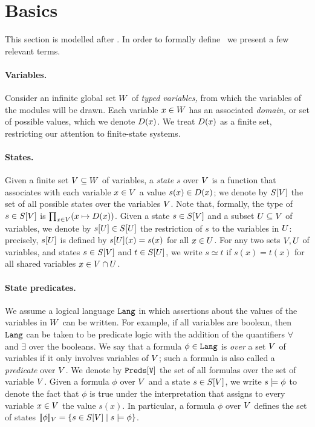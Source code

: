 \section{Basics}
This section is modelled after \cite{daLect}. In order to formally
define \im \ we present a few relevant terms.


\paragraph{Variables.}
Consider an infinite global set ${ W}$ of {\em typed
variables,} from which the variables of the modules will be drawn.
Each variable $x \in {W}$ has an associated {\em domain,} or
set of possible values, which we denote ${ D}(x)$. We treat
${ D}(x)$ as a finite set, restricting our attention to
finite-state systems.

\paragraph{States.}
Given a finite set ${ V}\subseteq{W}$ of variables, a {\em
state\/} $s$ over ${ V}$ is a function that associates with each
variable $x \in {V}$ a value $s(x) \in {D}(x)$; we denote by
${ S}[{ V}]$ the set of all possible states over the variables
${ V}$. Note that, formally, the type of $s \in {S}[{ V}]$
is $\prod_{x\in{V}} (x \mapsto {D}(x))$. Given a state $s
\in {S}[{ V}]$ and a subset ${ U} \subseteq {V}$ of
variables, we denote by $s[{ U}] \in {S}[{ U}]$ the
restriction of $s$ to the variables in ${ U}$: precisely,
$s[{ U}]$ is defined by $s[{ U}](x) = s(x)$ for all $x \in
{U}$. For any two sets ${ V},{ U}$ of variables, and states
$s \in {S}[{ V}]$ and $t \in {S}[{ U}]$, we write $s
\simeq t$ if $s(x) = t(x)$ for all shared variables $x \in {V}
\cap {U}$.

\paragraph{State predicates.}
We assume a logical language ${\tt{Lang}}$ in which assertions about
the values of the variables in ${ W}$ can be written. For
example, if all variables are boolean, then ${\tt{Lang}}$ can be
taken to be predicate logic with the addition of the quantifiers
$\forall$ and $\exists$ over the booleans. We say that a formula
$\phi\in{\tt{Lang}}$ is {\em over\/} a set ${ V}$ of variables if it
only involves variables of ${ V}$; such a formula is also called
a {\em predicate\/} over ${ V}$. We denote by $\tt{Preds}[{ V}]$ the
set of all formulas over the set of variable ${ V}$. Given a
formula $\phi$ over ${ V}$ and a state $s \in {S}[{ V}]$, we
write $s \models \phi$ to denote the fact that $\phi$ is true under
the interpretation that assigns to every variable $x \in {V}$
the value $s(x)$. In particular, a formula $\phi$ over ${ V}$
defines the set of states $[\![ \phi ]\!]_{ V} = \{ s \in
{S}[{ V}] \mid s \models \phi \}$.

